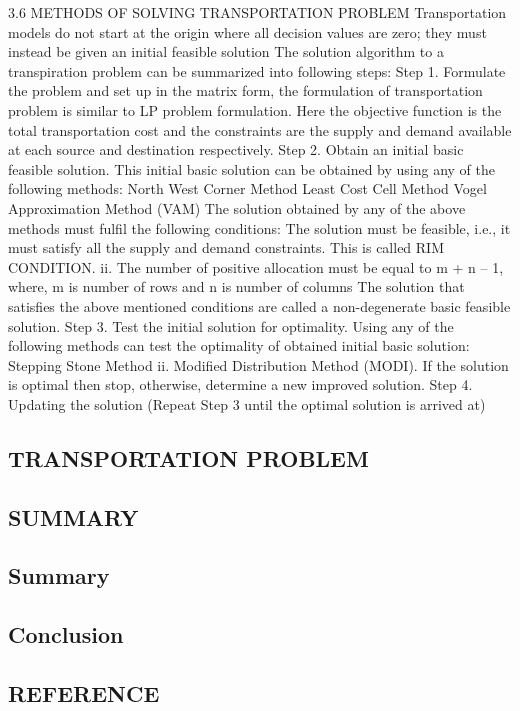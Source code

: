 \documentclass{article}
\begin{document}
3.6 METHODS OF SOLVING TRANSPORTATION PROBLEM 
Transportation models do not start at the origin where all decision values are zero; they must instead be given an initial feasible solution The solution algorithm to a transpiration problem can be summarized into following steps: 
Step 1. Formulate the problem and set up in the matrix form, the formulation of transportation problem is similar to LP problem formulation. Here the objective function is the total transportation cost and the constraints are the supply and demand available at each source and destination respectively. 
Step 2. Obtain an initial basic feasible solution. This initial basic solution can be obtained by using any of the following methods: 
North West Corner Method 
Least Cost Cell Method 
Vogel Approximation Method  (VAM)
The solution obtained by any of the above methods must fulfil the following conditions: 
The solution must be feasible, i.e., it must satisfy all the supply and demand constraints. This is called RIM CONDITION. 
ii. The number of positive allocation must be equal to m + n – 1, where, m is number of rows and n is number of columns
The solution that satisfies the above mentioned conditions are called a non-degenerate basic feasible solution. 
Step 3. Test the initial solution for optimality. Using any of the following methods can test the optimality of obtained initial basic solution: 
Stepping Stone Method 
ii. Modified Distribution Method (MODI).
If the solution is optimal then stop, otherwise, determine a new improved solution. 
Step 4. Updating the solution (Repeat Step 3 until the optimal solution is arrived at)



\newpage

\begin{center}
	\section{TRANSPORTATION PROBLEM}
\end{center}

\newpage

\begin{center}
	\section{SUMMARY}
\end{center}
\subsection{Summary}
\subsection{Conclusion}

\newpage

\begin{center}
	\section{REFERENCE}
\end{center}
\end{document}
